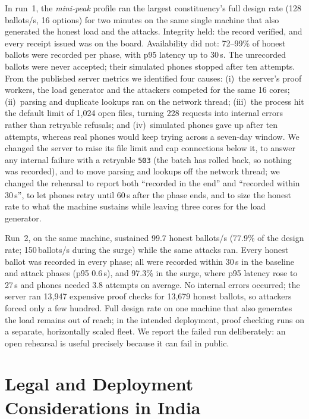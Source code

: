 \documentclass[runningheads]{llncs}
\begin{document}
In run~1, the \emph{mini-peak} profile ran the largest constituency's full design rate (128 ballots/s, 16 options) for two minutes on the same single machine that also generated the honest load and the attacks. Integrity held: the record verified, and every receipt issued was on the board. Availability did not: 72--99\% of honest ballots were recorded per phase, with p95 latency up to 30\,s. The unrecorded ballots were never accepted; their simulated phones stopped after ten attempts. From the published server metrics we identified four causes: (i)~the server's proof workers, the load generator and the attackers competed for the same 16 cores; (ii)~parsing and duplicate lookups ran on the network thread; (iii)~the process hit the default limit of 1,024 open files, turning 228 requests into internal errors rather than retryable refusals; and (iv)~simulated phones gave up after ten attempts, whereas real phones would keep trying across a seven-day window. We changed the server to raise its file limit and cap connections below it, to answer any internal failure with a retryable \texttt{503} (the batch has rolled back, so nothing was recorded), and to move parsing and lookups off the network thread; we changed the rehearsal to report both ``recorded in the end'' and ``recorded within 30\,s'', to let phones retry until 60\,s after the phase ends, and to size the honest rate to what the machine sustains while leaving three cores for the load generator.

Run~2, on the same machine, sustained 99.7 honest ballots/s (77.9\% of the design rate; 150\,ballots/s during the surge) while the same attacks ran. Every honest ballot was recorded in every phase; all were recorded within 30\,s in the baseline and attack phases (p95 0.6\,s), and 97.3\% in the surge, where p95 latency rose to 27\,s and phones needed 3.8 attempts on average. No internal errors occurred; the server ran 13,947 expensive proof checks for 13,679 honest ballots, so attackers forced only a few hundred. Full design rate on one machine that also generates the load remains out of reach; in the intended deployment, proof checking runs on a separate, horizontally scaled fleet. We report the failed run deliberately: an open rehearsal is useful precisely because it can fail in public.

\section{Legal and Deployment Considerations in India}\label{sec:law}
\end{document}
